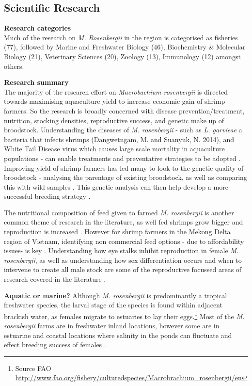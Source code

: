 \documentclass[]{book}
\let\rmarkdownfootnote\footnote%
\def\footnote{\protect\rmarkdownfootnote}
\theoremstyle{definition}
\theoremstyle{definition}
\theoremstyle{definition}
\theoremstyle{remark}
\begin{document}
\hypertarget{scientific-research-3}{%
\subsection{Scientific Research}\label{scientific-research-3}}

\textbf{Research categories}\\
Much of the research on \emph{M. Rosenbergii} in the region is
categorised as fisheries (77), followed by Marine and Freshwater Biology
(46), Biochemistry \& Molecular Biology (21), Veterinary Sciences (20),
Zoology (13), Immunology (12) amongst others.

\textbf{Research summary}\\
The majority of the research effort on \emph{Macrobachium rosenbergii}
is directed towards maximising aquaculture yield to increase economic
gain of shrimp farmers. So the research is broadly concerned with
disease prevention/treatment, nutrition, stocking densities,
reproductive success, and genetic make up of broodstock. Understanding
the diseases of \emph{M. rosenbergii} - such as \emph{L. garvieae} a
bacteria that infects shrimps (Dangwetngam, M. and Suanyuk, N. 2014),
and White Tail Disease virus which causes large scale mortality in
aquaculture populations - can enable treatments and preventative
strategies to be adopted \citep{Bonami_2011}. Improving yield of shrimp
farmers has led many to look to the genetic quality of broodstock -
analysing the parentage of existing broodstock, as well as comparing
this with wild samples \citep{Karaket_2012, Nguyen_Thanh_2015}. This
genetic analysis can then help develop a more successful breeding
strategy \citep{Thanh_2010}.

The nutritional composition of feed given to farmed \emph{M.
rosenbergii} is another common theme of research in the literature, as
well fed shrimps grow bigger and reproduction is increased
\citep{Kangpanich_2016}. However for shrimp farmers in the Mekong Delta
region of Vietnam, identifying non commercial feed options - due to
affordability issues- is key \citep{Hien_2005}. Understanding how eye
stalks inhibit reproduction in female \emph{M. rosenbergii}, as well as
understanding how sex differentiation occurs and when to intervene to
create all male stock are some of the reproductive focussed areas of
research covered in the literature
\citep{Sripiromrak_2014, Jung_2016, Rungsin_2012}.

\textbf{Aquatic or marine?} Although \emph{M. rosenbergii} is
predominantly a tropical freshwater species, the larval stage of the
species is found within adjacent brackish water, as females migrate to
estuaries to lay their eggs.\footnote{Source FAO
  \url{http://www.fao.org/fishery/culturedspecies/Macrobrachium_rosenbergii/en}}
Most of the \emph{M. rosenbergii} farms are in freshwater inland
locations, however some are in estuarine and coastal locations where
salinity in the ponds can fluctuate and effect breeding success of
females \citep{Yen_2008}.
\end{document}
